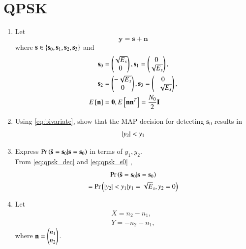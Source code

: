 \documentclass[journal,12pt,twocolumn]{IEEEtran}
\renewcommand\thesection{\arabic{section}}
\begin{document}
\section{QPSK}
\begin{enumerate}[label=\arabic*.,ref=\thesection.\theenumi]
%
\item Let
\begin{equation}
\label{eq:qpsk_rx}
\mathbf{y} = \mathbf{s}+ \mathbf{n}
\end{equation}
where $\mathbf{s} \in \left\{\mathbf{s}_0,\mathbf{s}_1,\mathbf{s}_2, \mathbf{s}_3\right\}$ and
\begin{align}
\label{eq:qpsk_s0}
\mathbf{s}_0 &= 
\begin{pmatrix*}
\sqrt{E_s}\\
0
\end{pmatrix*},
\mathbf{s}_1 = 
\begin{pmatrix*}
0\\
\sqrt{E_s}
\end{pmatrix*},
\\
\mathbf{s}_2 &= 
\begin{pmatrix*}
-\sqrt{E_s}\\
0
\end{pmatrix*},
\mathbf{s}_3 = 
\begin{pmatrix*}
0\\
-\sqrt{E_s}
\end{pmatrix*},
\\
E\sbrak{\mathbf{n}} &= \mathbf{0}, E\sbrak{\mathbf{n}\mathbf{n}^T} = \frac{N_0}{2} \mathbf{I}
\label{eq:qpsk_mean}
\end{align}
%
\item Using \eqref{eq:bivariate}, show that the MAP decision for detecting $\mathbf{s}_0$ results in
\begin{equation}
\label{eq:qpsk_dec}
\left\vert y_2\right\vert < y_1
\end{equation}

\item Express $\Pr\left(\hat{\mathbf{s}} = \mathbf{s}_0|\mathbf{s} = \mathbf{s}_0\right)$ in terms of 
$y_1, y_2$.
\\
\solution From \eqref{eq:qpsk_dec} and \eqref{eq:qpsk_s0}
,
\begin{multline}
\label{eq:ser_dec}
\Pr\left(\hat{\mathbf{s}} = \mathbf{s}_0|\mathbf{s} = \mathbf{s}_0\right) 
\\
= \Pr\left(\left\vert y_2\right\vert < y_1
|y_1 = \sqrt{E}_s, y_2 = 0\right)
\end{multline}
\item Let 
\label{prob:qpsk_xy}
\begin{align}
\label{eq:qpskx}
X=n_2-n_1, 
\\
Y = -n_2-n_1, 
\label{eq:qpsky}
\end{align}
where $\mathbf{n}=\begin{pmatrix}n_1\\n_2\end{pmatrix}$.


\end{enumerate}
\end{document}

